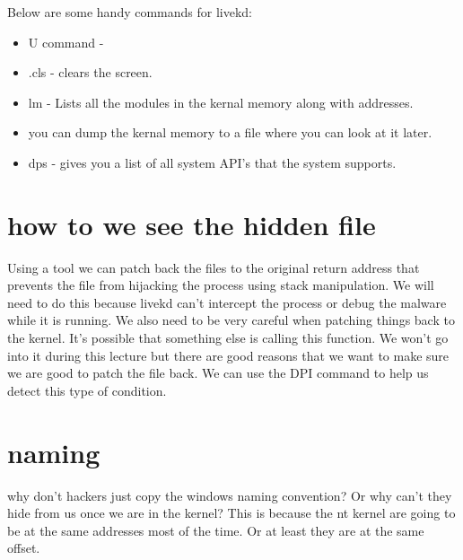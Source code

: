 \documentclass[letterpaper, onecolumn,10pt]{IEEEtran}
\begin{document}
		    Below are some handy commands for livekd:
		    \begin{itemize}
		        \item U command - 
		        \item .cls - clears the screen.\\
		        \item lm - Lists all the modules in the kernal memory along with addresses.\\
		        \item you can dump the kernal memory to a file where you can look at it later.\\
		        \item dps - gives you a list of all system API's that the system supports.\\
		    \end{itemize}
		    
		    \section{how to we see the hidden file}
		    Using a tool we can patch back the files to the original return address that prevents the file from hijacking the process using stack manipulation. We will need to do this because livekd can't intercept the process or debug the malware while it is running. We also need to be very careful when patching things back to the kernel. It's possible that something else is calling this function. We won't go into it during this lecture but there are good reasons that we want to make sure we are good to patch the file back. We can use the DPI command to help us detect this type of condition.\\
		   
		   \section{naming}
		    why don't hackers just copy the windows naming convention? Or why can't they hide from us once we are in the kernel? This is because the nt kernel are going to be at the same addresses most of the time. Or at least they are at the same offset.\\
		    
\end{document}
